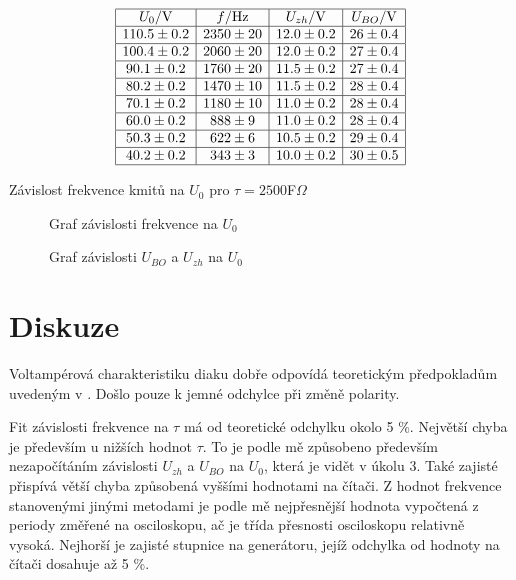 \documentclass[a4paper,12pt]{article}
\begin{document}
    \begin{table}
    $$
    \begin{array}{|c|c|c|c|}
    \hline
    U_0/\mbox{V}&   f/\mbox{Hz}&    U_{zh}/\mbox{V}&    U_{BO}/\mbox{V} \\ \hline
    110.5\pm0.2&    2350\pm20&  12.0\pm0.2&   26\pm0.4 \\ \hline
    100.4\pm0.2&    2060\pm20&  12.0\pm0.2&   27\pm0.4 \\ \hline
    90.1\pm0.2&     1760\pm20&  11.5\pm0.2& 27\pm0.4 \\ \hline
    80.2\pm0.2&     1470\pm10&  11.5\pm0.2& 28\pm0.4 \\ \hline
    70.1\pm0.2&     1180\pm10&  11.0\pm0.2& 28\pm0.4 \\ \hline
    60.0\pm0.2&     888\pm9&    11.0\pm0.2& 28\pm0.4 \\ \hline
    50.3\pm0.2&     622\pm6&    10.5\pm0.2& 29\pm0.4 \\ \hline
    40.2\pm0.2&     343\pm3&    10.0\pm0.2& 30\pm0.5 \\ \hline
    \end{array}
    $$
    \caption{Závislost frekvence kmitů na $U_0$ pro $\tau=2500$F$\Omega$}
    \label{TUk3b}
    \end{table}
    
    \begin{figure}
    
    \caption{Graf závislosti frekvence na $U_0$}
    \label{g3}
    \end{figure}
    
    \begin{figure}
    
    \caption{Graf závislosti $U_{BO}$ a $U_{zh}$ na $U_0$}
    \label{g4}
    \end{figure}

\section{Diskuze}
    Voltampérová charakteristiku diaku dobře odpovídá teoretickým předpokladům uvedeným v \cite{text}. Došlo 
    pouze k jemné odchylce při změně polarity. 

    Fit závislosti frekvence na $\tau$ má od teoretické odchylku okolo 5 \%. Největší chyba je především u nižších 
    hodnot $\tau$. To je podle mě způsobeno především nezapočítáním závislosti $U_{zh}$ a $U_{BO}$ na $U_0$, která 
    je vidět v úkolu 3. Také zajisté přispívá větší chyba způsobená vyššími hodnotami na čítači. Z hodnot frekvence 
    stanovenými jinými metodami je podle mě nejpřesnější hodnota vypočtená z periody změřené na osciloskopu, ač je třída 
    přesnosti osciloskopu relativně vysoká. Nejhorší je zajisté stupnice na generátoru, jejíž odchylka od hodnoty na čítači 
    dosahuje až 5 \%.
\end{document}
